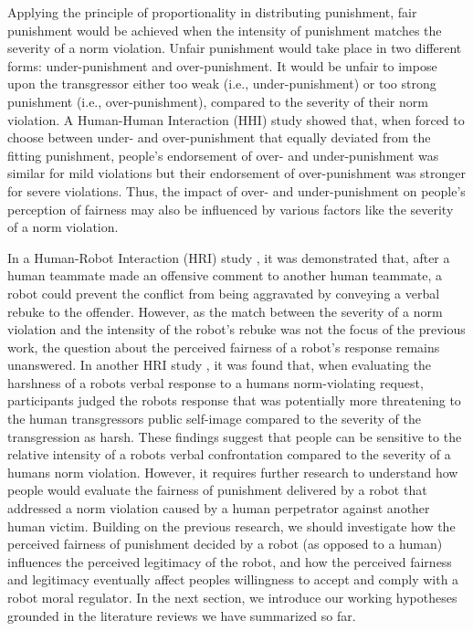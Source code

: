 \documentclass{article} %
\begin{document}
Applying the principle of proportionality in distributing punishment, fair punishment would be achieved when the intensity of punishment matches the severity of a norm violation. Unfair punishment would take place in two different forms: under-punishment and over-punishment. It would be unfair to impose upon the transgressor either too weak (i.e., under-punishment) or too strong punishment (i.e., over-punishment), compared to the severity of their norm violation. A Human-Human Interaction (HHI) study \cite{wagstaff1997overpunishment} showed that, when forced to choose between under- and over-punishment that equally deviated from the fitting punishment, people's endorsement of over- and under-punishment was similar for mild violations but their endorsement of over-punishment was stronger for severe violations. Thus, the impact of over- and under-punishment on people's perception of fairness may also be influenced by various factors like the severity of a norm violation.

In a Human-Robot Interaction (HRI) study \cite{jung2015using}, it was demonstrated that, after a human teammate made an offensive comment to another human teammate, a robot could prevent the conflict from being aggravated by conveying a verbal rebuke to the offender. However, as the match between the severity of a norm violation and the intensity of the robot's rebuke was not the focus of the previous work, the question about the perceived fairness of a robot's response remains unanswered. In another HRI study \cite{jackson2019tact}, it was found that, when evaluating the harshness of a robots verbal response to a humans norm-violating request, participants judged the robots response that was potentially more threatening to the human transgressors public self-image compared to the severity of the transgression as harsh. These findings suggest that people can be sensitive to the relative intensity of a robots verbal confrontation compared to the severity of a humans norm violation. However, it requires further research to understand how people would evaluate the fairness of punishment delivered by a robot that addressed a norm violation caused by a human perpetrator against another human victim. Building on the previous research, we should investigate how the perceived fairness of punishment decided by a robot (as opposed to a human) influences the perceived legitimacy of the robot, and how the perceived fairness and legitimacy eventually affect peoples willingness to accept and comply with a robot moral regulator. In the next section, we introduce our working hypotheses grounded in the literature reviews we have summarized so far.
\end{document}
